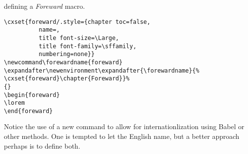 \begin{texexample}{defining a \textit{Foreward} macro.}{}
\begin{lstlisting}
\cxset{foreward/.style={chapter toc=false,
          name=,
          title font-size=\Large,
          title font-family=\sffamily,
          numbering=none}}
\newcommand\forewardname{foreward}
\expandafter\newenvironment\expandafter{\forewardname}{%
\cxset{foreward}\chapter{Foreward}}%
{}
\begin{foreward}
\lorem
\end{foreward}
\end{lstlisting}
\end{texexample}



Notice the use of a new command  to allow for internationlization using Babel or other methods. One is tempted to let the English name, but a better approach perhaps is to define both.



